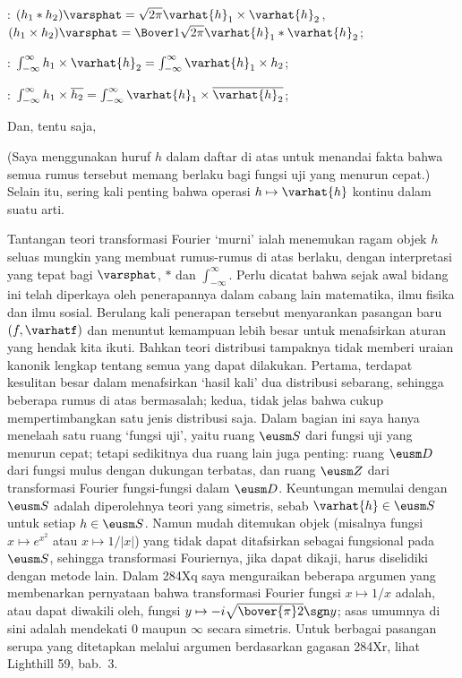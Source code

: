 {:
$(h_1*h_2)\varsphat=\sqrt{2\pi}\varhat{h}_1\times\varhat{h}_2$, %
\quad $(h_1\times h_2)\varsphat
=\Bover1{\sqrt{2\pi}}\varhat{h}_1*\varhat{h}_2$; %

: $\int_{-\infty}^{\infty}h_1\times\varhat{h}_2
=\int_{-\infty}^{\infty}\varhat{h}_1\times h_2$;

: $\int_{-\infty}^{\infty}h_1\times\overline{h_2}
=\int_{-\infty}^{\infty}\varhat{h}_1\times\overline{\varhat{h}_2}$; %

\noindent Dan, tentu saja,



\noindent (Saya menggunakan huruf $h$ dalam daftar di atas untuk menandai fakta
bahwa semua rumus tersebut memang berlaku bagi fungsi uji yang menurun cepat.)
Selain itu, sering kali penting bahwa operasi $h\mapsto\varhat{h}$ kontinu
dalam suatu arti.

Tantangan teori transformasi Fourier `murni' ialah menemukan ragam objek $h$
seluas mungkin yang membuat rumus-rumus di atas berlaku, dengan interpretasi
yang tepat bagi $\varsphat$, $*$ dan $\int_{-\infty}^{\infty}$. Perlu dicatat
bahwa sejak awal bidang ini telah diperkaya oleh penerapannya dalam cabang lain
matematika, ilmu fisika dan ilmu sosial. Berulang kali penerapan tersebut
menyarankan pasangan baru $(f,\varhatf)$ dan menuntut kemampuan lebih besar
untuk menafsirkan aturan yang hendak kita ikuti. Bahkan teori distribusi
tampaknya tidak memberi uraian kanonik lengkap tentang semua yang dapat
dilakukan. Pertama, terdapat kesulitan besar dalam menafsirkan `hasil kali' dua
distribusi sebarang, sehingga beberapa rumus di atas bermasalah; kedua, tidak
jelas bahwa cukup mempertimbangkan satu jenis distribusi saja. Dalam bagian ini
saya hanya menelaah satu ruang `fungsi uji', yaitu ruang $\eusm S$ dari fungsi
uji yang menurun cepat; tetapi sedikitnya dua ruang lain juga penting: ruang
$\eusm D$ dari fungsi mulus dengan dukungan terbatas, dan ruang $\eusm Z$ dari
transformasi Fourier fungsi-fungsi dalam $\eusm D$. Keuntungan memulai dengan
$\eusm S$ adalah diperolehnya teori yang simetris, sebab
$\varhat{h}\in\eusm S$ untuk setiap $h\in\eusm S$. Namun mudah ditemukan objek
(misalnya fungsi $x\mapsto e^{x^2}$ atau $x\mapsto 1/|x|$) yang tidak dapat
ditafsirkan sebagai fungsional pada $\eusm S$, sehingga transformasi
Fouriernya, jika dapat dikaji, harus diselidiki dengan metode lain. Dalam 284Xq
saya menguraikan beberapa argumen yang membenarkan pernyataan bahwa transformasi
Fourier fungsi $x\mapsto 1/x$ adalah, atau dapat diwakili oleh, fungsi
$y\mapsto -i\sqrt{\bover{\pi}2}\sgn y$; asas umumnya di sini adalah mendekati
$0$ maupun $\infty$ secara simetris. Untuk berbagai pasangan serupa yang
ditetapkan melalui argumen berdasarkan gagasan 284Xr, lihat {\smc Lighthill
59}, bab.\ 3.

}
